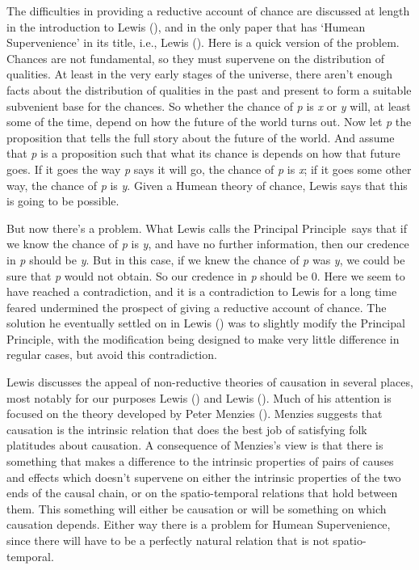 \documentclass[
  10pt,
  letterpaper,
  DIV=11,
  numbers=noendperiod,
  twoside]{scrartcl}
\begin{document}
The difficulties in providing a reductive account of chance are
discussed at length in the introduction to Lewis
(), and in the only paper that has
`Humean Supervenience' in its title, i.e., Lewis
(). Here is a quick version of the
problem. Chances are not fundamental, so they must supervene on the
distribution of qualities. At least in the very early stages of the
universe, there aren't enough facts about the distribution of qualities
in the past and present to form a suitable subvenient base for the
chances. So whether the chance of \emph{p} is \emph{x} or \emph{y} will,
at least some of the time, depend on how the future of the world turns
out. Now let \emph{p} the proposition that tells the full story about
the future of the world. And assume that \emph{p} is a proposition such
that what its chance is depends on how that future goes. If it goes the
way \emph{p} says it will go, the chance of \emph{p} is \emph{x}; if it
goes some other way, the chance of \emph{p} is \emph{y}. Given a Humean
theory of chance, Lewis says that this is going to be possible.

But now there's a problem. What Lewis calls the Principal Principle~says
that if we know the chance of \emph{p} is \emph{y}, and have no further
information, then our credence in \emph{p} should be \emph{y}. But in
this case, if we knew the chance of \emph{p} was \emph{y}, we could be
sure that \emph{p} would not obtain. So our credence in \emph{p} should
be 0. Here we seem to have reached a contradiction, and it is a
contradiction to Lewis for a long time feared undermined the prospect of
giving a reductive account of chance. The solution he eventually settled
on in Lewis () was to slightly modify
the Principal Principle, with the modification being designed to make
very little difference in regular cases, but avoid this contradiction.

Lewis discusses the appeal of non-reductive theories of causation in
several places, most notably for our purposes Lewis
() and Lewis
(). Much of his attention is focused on
the theory developed by Peter Menzies
(). Menzies suggests that causation is
the intrinsic relation that does the best job of satisfying folk
platitudes about causation. A consequence of Menzies's view is that
there is something that makes a difference to the intrinsic properties
of pairs of causes and effects which doesn't supervene on either the
intrinsic properties of the two ends of the causal chain, or on the
spatio-temporal relations that hold between them. This something will
either be causation or will be something on which causation depends.
Either way there is a problem for Humean Supervenience, since there will
have to be a perfectly natural relation that is not spatio-temporal.
\end{document}
